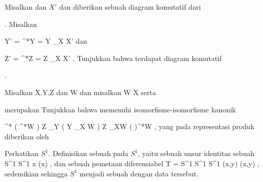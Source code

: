 {}
{

Misalkan
 dan $X'$
dan diberikan sebuah diagram komutatif dari

 {  }

. Misalkan

\mavergleichskette
{\vergleichskette
{ Y'
}
{ = }{ \varphi^*Y
}
{ = }{ Y \times_X X'
}
{    }{
}
{   }{
}
}
{}{}{}
dan

\mavergleichskette
{\vergleichskette
{ Z'
}
{ = }{ \varphi^*Z
}
{ = }{ Z \times_X X'
}
{    }{
}
{   }{
}
}
{}{}{.}
Tunjukkan bahwa terdapat diagram komutatif

 {  }

.

}
{} {}

{}
{

Misalkan
\mathkor {} {X,Y,Z} {dan} {W} {}
dan misalkan
\maabb {} { W } { X
} {}
serta

 {  }

merupakan
Tunjukkan bahwa
 {} {}
memenuhi isomorfisme-isomorfisme kanonik

\mavergleichskettedisp
{\vergleichskette
{ \varphi^* \left(  \psi^*W  \right)
}
{ \cong} { Z \times_Y \left(  Y \times_X W  \right)
}
{ \cong} { Z \times_XW
}
{ \cong} { ( \psi \circ \varphi)^*W
}
{ } {
}
}
{}{}{,}
yang pada representasi produk diberikan oleh

}
{} {}

{}
{

Perhatikan
$S^1$. Definisikan sebuah  {} pada $S^1$, yaitu sebuah unsur identitas
 sebuah
\maabbeledisp {\alpha} {S^1} {S^1
} { x } { \alpha (x)
} {,}
dan sebuah pemetaan diferensiabel
\maabbeledisp {} {T = S^1 \times S^1} {S^1
} {(x,y)} { \varphi(x,y)
} {,}
sedemikian sehingga $S^1$ menjadi sebuah
dengan data tersebut.

}
{} {}

